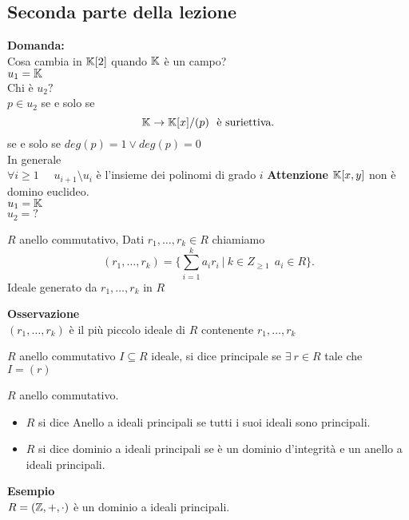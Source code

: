 \documentclass{article}
\begin{document}

\maketitle
	\newpage
	\subsection{Seconda parte della lezione}
	\textbf{Domanda:}\\
	Cosa cambia in $\mathbb{K}[2]$ quando  $\mathbb{K}$ è un campo?\\
	$u_1 = \mathbb{K}$ \\
	Chi è $u_2 ?$\\
	$p\in u_2$ se e solo se
	\[
		\K \rightarrow \K[x]/(p) \ \text{ è suriettiva}
	.\] 
	se e solo se $deg(p) = 1 \vee deg(p) = 0$\\
	In generale\\
	$\forall i\geq 1$ \ \  $u_{i+1}\setminus u_i$ è l'insieme dei polinomi di grado $i$
	\textbf{Attenzione} $\mathbb{K}[x,y]$ non è domino euclideo.\\
	$u_1 = \mathbb{K}$\\
	 $u_2 = ?$\\
	 \begin{defi}
	 	$R$ anello commutativo, Dati $r_1,\ldots, r_k\in R$ chiamiamo
		\[
			(r_1,\ldots,r_k) = \{ \sum^{k}_{i=1}a_ir_i \ | \ k\in Z_{\geq 1}\ \ a_i\in R\}
		.\] 
Ideale generato da $r_1,\ldots, r_k$ in $R$\\
	 \end{defi}
\textbf{Osservazione}\\
$(r_1,\ldots, r_k)$ è il più piccolo ideale di $R$ contenente $r_1,\ldots,r_k$
\begin{defi}
	$R$ anello commutativo $I\subseteq R$ ideale, si dice principale se $\exists \ r\in R$ tale che $I = (r)$
\end{defi}
\begin{defi}
	$R$ anello commutativo.
	\begin{itemize}
		\item $R$ si dice Anello a ideali principali se tutti i suoi ideali sono principali.
		\item  $R$ si dice dominio a ideali principali se è un dominio d'integrità e un anello a ideali principali.
	\end{itemize}
\end{defi}
\textbf{Esempio}\\
$R = (\mathbb{Z},+,\cdot)$ è un dominio a ideali principali.\\
\end{document}
